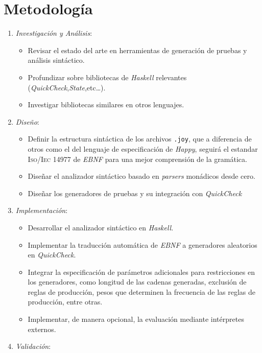 \documentclass[11pt]{article}
\begin{document}
\section*{Metodología}

\begin{enumerate}
\item \textit{Investigación y Análisis}:

  \begin{itemize}
  \item Revisar el estado del arte en herramientas de generación de pruebas y análisis sintáctico.
  \item Profundizar sobre bibliotecas de \textit{Haskell} relevantes (\textit{QuickCheck},\textit{State},etc\ldots).
  \item Investigar bibliotecas similares en otros lenguajes.
  \end{itemize}
\item \textit{Diseño}:

  \begin{itemize}
  \item Definir la estructura sintáctica de los archivos \texttt{.joy}, que a diferencia de otros como el del lenguaje de especificación de \textit{Happy}\cite{happy_docs}, seguirá el estandar \textsc{Iso/Iec 14977}\cite{ebnf} de \textit{EBNF} para una mejor comprensión de la gramática.
  \item Diseñar el analizador sintáctico basado en \textit{parsers} monádicos desde cero.
  \item Diseñar los generadores de pruebas y su integración con \textit{QuickCheck}
  \end{itemize}
\item \textit{Implementación}:

  \begin{itemize}
  \item Desarrollar el analizador sintáctico en \textit{Haskell}.
  \item Implementar la traducción automática de \textit{EBNF} a generadores aleatorios en \textit{QuickCheck}.
  \item Integrar la especificación de parámetros adicionales para restricciones en los generadores, como longitud de las cadenas generadas, exclusión de reglas de producción, pesos que determinen la frecuencia de las reglas de producción, entre otras.
  \item Implementar, de manera opcional, la evaluación mediante intérpretes externos.
  \end{itemize}
\item \textit{Validación}:


\end{enumerate}
\end{document}

